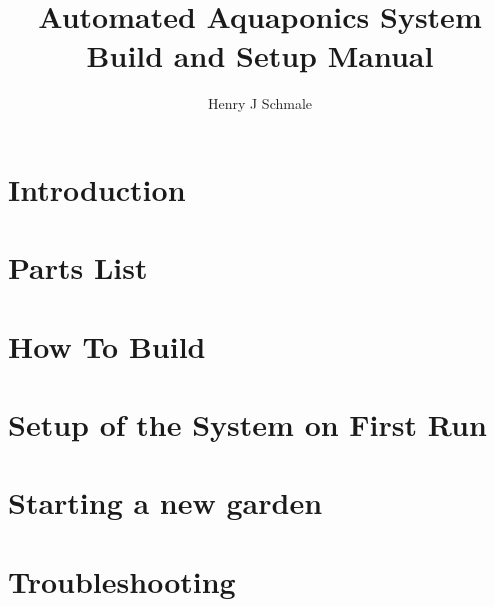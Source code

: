 \documentclass[american,doc,12pt]{apa6}
\title{Automated Aquaponics System Build and Setup Manual}
\author{Henry J Schmale}
\affiliation{Harrisburg University of Science and Technology}
\begin{document}
\maketitle
\tableofcontents

\section{Introduction}


\section{Parts List}



\section{How To Build}



\section{Setup of the System on First Run}



\section{Starting a new garden}



\section{Troubleshooting}



\printbibliography
\end{document}
